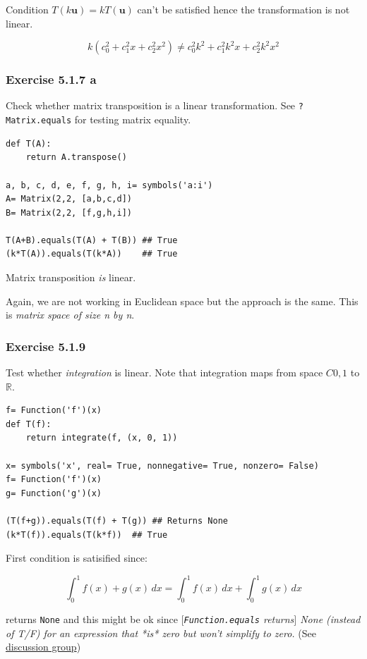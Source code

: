 Condition $T(k\mathbf{u}) = kT(\mathbf{u})$ can't be satisfied hence the
transformation is not linear.

$$
k \left(c_{0}^{2} + c_{1}^{2} x + c_{2}^{2} x^{2}\right) \neq c_{0}^{2} k^{2} + c_{1}^{2} k^{2} x + c_{2}^{2} k^{2} x^{2}
$$

\subsubsection{Exercise 5.1.7 a}

Check whether matrix transposition is a linear transformation. See \texttt{?Matrix.equals}
for testing matrix equality.

\begin{verbatim}
def T(A):
    return A.transpose()

a, b, c, d, e, f, g, h, i= symbols('a:i')
A= Matrix(2,2, [a,b,c,d])
B= Matrix(2,2, [f,g,h,i])

T(A+B).equals(T(A) + T(B)) ## True
(k*T(A)).equals(T(k*A))    ## True
\end{verbatim}

Matrix transposition \emph{is} linear.

Again, we are not working in Euclidean space but the approach is the same. This
is \emph{matrix space of size \emph{n} by \emph{n}}.

\subsubsection{Exercise 5.1.9}

Test whether \emph{integration} is linear. Note that integration maps from space
$C{0, 1}$ to $\mathbb{R}$.

\begin{verbatim}
f= Function('f')(x)
def T(f):
    return integrate(f, (x, 0, 1))
    
x= symbols('x', real= True, nonnegative= True, nonzero= False)
f= Function('f')(x)
g= Function('g')(x)

(T(f+g)).equals(T(f) + T(g)) ## Returns None
(k*T(f)).equals(T(k*f))  ## True
\end{verbatim}

First condition is satisified since:

$$
\int_{0}^{1} f{\left (x \right )} + g{\left (x \right )}\, dx = \int_{0}^{1} f{\left (x \right )}\, dx + \int_{0}^{1} g{\left (x \right )}\, dx
$$

\sympy returns \texttt{None} and this might be ok since \emph{$[$\texttt{Function.equals} returns$]$ None
(instead of T/F) for an expression that *is* zero but won't simplify to zero.}
(See \href{https://groups.google.com/forum/#!topic/sympy/xP_uM49pXeo}{\sympy discussion group})

